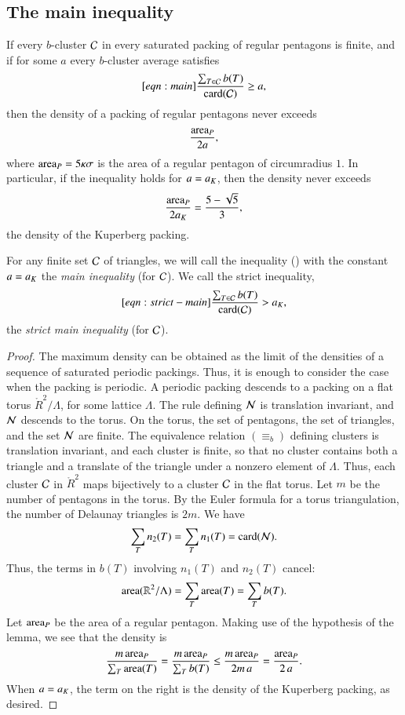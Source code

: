 \subsection{The main inequality}

\begin{lemma}  
If  every $b$-cluster $\mathcal C$ in every saturated packing of regular
  pentagons is finite, and if for some $a$ every $b$-cluster average
  satisfies
\begin{equation}\libel{eqn:main}
\frac{\sum_{T\in \C} b(T)}{\card(\C)} \ge a,
\end{equation}
then the density of a packing of regular pentagons never exceeds 
\[
\frac{{\operatorname{area}}_P} {2 a},
\]
where ${\operatorname{area}}_P = 5\kappa\sigma$ is the area of a regular pentagon of
circumradius $1$.  In particular, if the inequality holds for $a=a_K$,
then the density never exceeds
\[
\frac{{\operatorname{area}}_P}{2 a_K} = \frac{5 - \sqrt{5}}{3},
\] %
the density of the Kuperberg packing.
\end{lemma}

For any finite set $\mathcal C$ of triangles, we will call the inequality
() with the constant $a=a_K$ the {\it main inequality}
(for $\mathcal C$).  We call the strict inequality,
\begin{equation}\libel{eqn:strict-main}
\frac{\sum_{T\in \C} b(T)}{\card(\C)} > \aK,
\end{equation}
the {\it strict main inequality} (for $\mathcal C$).


\begin{proof} The maximum density can be obtained as the limit of the
  densities of a sequence of saturated periodic packings.  Thus, it is
  enough to consider the case when the packing is periodic.  A
  periodic packing descends to a packing on a flat torus
  $\ring{R}^2/\Lambda$, for some lattice $\Lambda$.  The rule defining
  $\mathcal N$ is translation invariant, and $\mathcal N$ descends to the torus.  On
  the torus, the set of pentagons, the set of triangles, and the set
  $\mathcal N$ are finite.  The equivalence relation $(\equiv_b)$ defining
  clusters is translation invariant, and each cluster is finite, so
  that no cluster contains both a triangle and a translate of the
  triangle under a nonzero element of $\Lambda$.  Thus, each cluster
  $\mathcal C$ in $\ring{R}^2$ maps bijectively to a cluster $\mathcal C$ in the flat
  torus.  Let $m$ be the number of pentagons in the torus.  By the
  Euler formula for a torus triangulation, the number of Delaunay
  triangles is $2m$.  We have
\[
\sum_{T} n_2(T) =  \sum_{T} n_1(T) = 
{\operatorname{card}}(\mathcal N).
\]
Thus, the terms in $b(T)$ involving $n_1(T)$ and $n_2(T)$ cancel:
\[
{\operatorname{area}}(\mathbb{R}^2/\Lambda) = \sum_T {\operatorname{area}}(T) = \sum_T b(T).
\]    
Let ${\operatorname{area}}_P$ be the area of a regular pentagon.  Making use of the
hypothesis of the lemma, we see that the density is
\[
\frac{m\, {\operatorname{area}}_P}{\sum_T {\operatorname{area}}(T)} 
=\frac{m\, {\operatorname{area}}_P}{\sum_T b(T)} \le\frac{m\, {\operatorname{area}}_P}{2 m\, a} 
= \frac{{\operatorname{area}}_P}{2\, a}.
\]
When $a=a_K$, the term on the right is the density of the Kuperberg
packing, as desired.
\end{proof}

